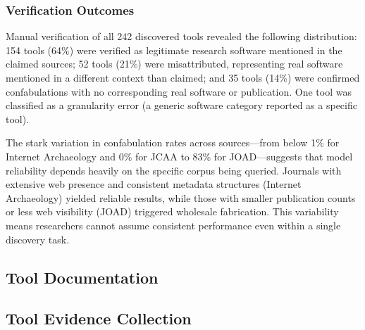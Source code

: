\subsubsection{Verification Outcomes}

Manual verification of all 242 discovered tools revealed the following distribution: 154 tools (64\%) were verified as legitimate research software mentioned in the claimed sources; 52 tools (21\%) were misattributed, representing real software mentioned in a different context than claimed; and 35 tools (14\%) were confirmed confabulations with no corresponding real software or publication. One tool was classified as a granularity error (a generic software category reported as a specific tool).

The stark variation in confabulation rates across sources---from below 1\% for Internet Archaeology and 0\% for JCAA to 83\% for JOAD---suggests that model reliability depends heavily on the specific corpus being queried. Journals with extensive web presence and consistent metadata structures (Internet Archaeology) yielded reliable results, while those with smaller publication counts or less web visibility (JOAD) triggered wholesale fabrication. This variability means researchers cannot assume consistent performance even within a single discovery task.


\subsection{Tool Documentation}




\subsection{Tool Evidence Collection}


